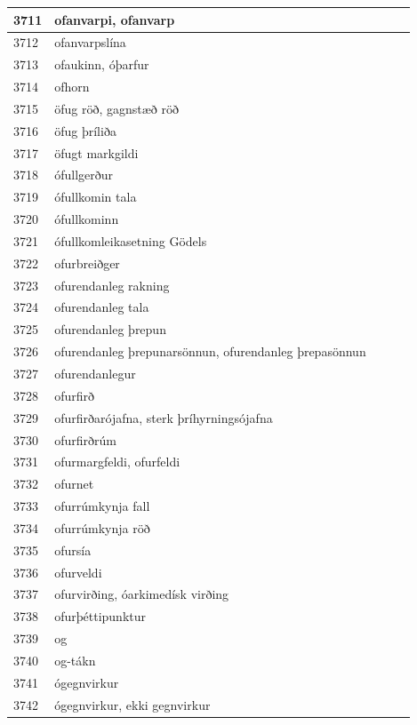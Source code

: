 \begin{longtable}{p{}|p{}|p{}|p{}|p{}}
\hline
3711 & ofanvarpi, ofanvarp &  &  &  \\
\hline
3712 & ofanvarpslína &  &  &  \\
\hline
3713 & ofaukinn, óþarfur &  &  &  \\
\hline
3714 & ofhorn &  &  &  \\
\hline
3715 & öfug röð, gagnstæð röð &  &  &  \\
\hline
3716 & öfug þríliða &  &  &  \\
\hline
3717 & öfugt markgildi &  &  &  \\
\hline
3718 & ófullgerður &  &  &  \\
\hline
3719 & ófullkomin tala &  &  &  \\
\hline
3720 & ófullkominn &  &  &  \\
\hline
3721 & ófullkomleikasetning Gödels &  &  &  \\
\hline
3722 & ofurbreiðger &  &  &  \\
\hline
3723 & ofurendanleg rakning &  &  &  \\
\hline
3724 & ofurendanleg tala &  &  &  \\
\hline
3725 & ofurendanleg þrepun &  &  &  \\
\hline
3726 & ofurendanleg þrepunarsönnun, ofurendanleg þrepasönnun &  &  &  \\
\hline
3727 & ofurendanlegur &  &  &  \\
\hline
3728 & ofurfirð &  &  &  \\
\hline
3729 & ofurfirðarójafna, sterk þríhyrningsójafna &  &  &  \\
\hline
3730 & ofurfirðrúm &  &  &  \\
\hline
3731 & ofurmargfeldi, ofurfeldi &  &  &  \\
\hline
3732 & ofurnet &  &  &  \\
\hline
3733 & ofurrúmkynja fall &  &  &  \\
\hline
3734 & ofurrúmkynja röð &  &  &  \\
\hline
3735 & ofursía &  &  &  \\
\hline
3736 & ofurveldi &  &  &  \\
\hline
3737 & ofurvirðing, óarkimedísk virðing &  &  &  \\
\hline
3738 & ofurþéttipunktur &  &  &  \\
\hline
3739 & og &  &  &  \\
\hline
3740 & og-tákn &  &  &  \\
\hline
3741 & ógegnvirkur &  &  &  \\
\hline
3742 & ógegnvirkur, ekki gegnvirkur &  &  &  \\

\end{longtable}
